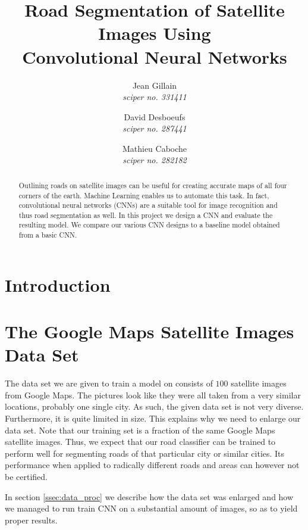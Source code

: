 \documentclass[10pt,conference,compsocconf]{IEEEtran}
\begin{document}
\title{Road Segmentation of Satellite Images Using \\ Convolutional Neural Networks}

\author{
	Jean Gillain\\
	\textit{sciper no. 331411}
	\and
	 David Desboeufs\\
	 \textit{sciper no. 287441}
	 \and 
	 Mathieu Caboche\\
	 \textit{sciper no. 282182}
}

\maketitle

\begin{abstract}
	Outlining roads on satellite images can be useful for creating accurate maps of all four corners of the earth. Machine Learning enables us to automate this task. In fact, convolutional neural networks (CNNs) are a suitable tool for image recognition and thus road segmentation as well. In this project we design a CNN and evaluate the resulting model. We compare our various CNN designs to a baseline model obtained from a basic CNN.
	
\end{abstract}

\section{Introduction}



\section{The Google Maps Satellite Images Data Set}
\label{sec:dataset}
The data set we are given to train a model on consists of $100$ satellite images from Google Maps. The pictures look like they were all taken from a very similar locations, probably one single city. As such, the given data set is not very diverse. Furthermore, it is quite limited in size. This explains why we need to enlarge our data set. Note that our training set is a fraction of the same Google Maps satellite images. Thus, we expect that our road classifier can be trained to perform well for segmenting roads of that particular city or similar cities. Its performance when applied to radically different roads and areas can however not be certified.

In section \ref{ssec:data_proc} we describe how the data set was enlarged and how we managed to run train CNN on a substantial amount of images, so as to yield proper results.
\end{document}

